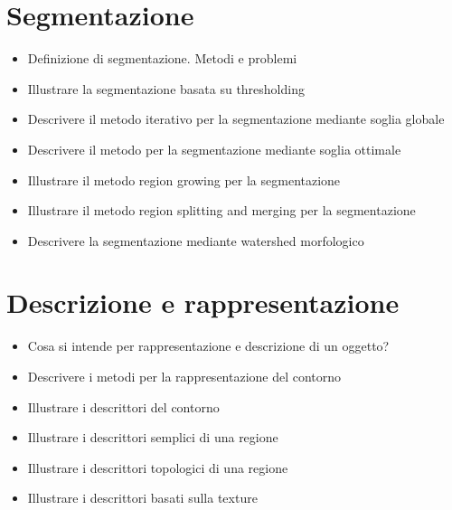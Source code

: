 \section{Segmentazione}
\begin{itemize}
	\item Definizione di segmentazione. Metodi e problemi
	\item Illustrare la segmentazione basata su thresholding
	\item Descrivere il metodo iterativo per la segmentazione mediante soglia globale
	\item Descrivere il metodo per la segmentazione mediante soglia ottimale
	\item Illustrare il metodo region growing per la segmentazione
	\item Illustrare il metodo region splitting and merging per la segmentazione
	\item Descrivere la segmentazione mediante watershed morfologico
\end{itemize}

\section{Descrizione e rappresentazione}
\begin{itemize}
	\item Cosa si intende per rappresentazione e descrizione di un oggetto?
	\item Descrivere i metodi per la rappresentazione del contorno
	\item Illustrare i descrittori del contorno
	\item Illustrare i descrittori semplici di una regione
	\item Illustrare i descrittori topologici di una regione
	\item Illustrare i descrittori basati sulla texture
\end{itemize}

